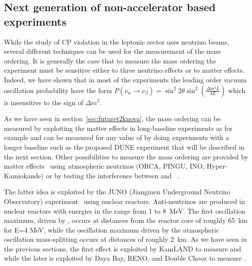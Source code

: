 \subsection{Next generation of non-accelerator based experiments}

While the study of CP violation in the leptonic sector uses neutrino beams, several different techniques can be used for the measurement of the mass ordering.
It is generally the case that to measure the mass ordering the experiment must be sensitive either to three neutrino effects or to matter effects. Indeed, we have shown that in most of the experiments the leading order vacuum oscillation probability have the form $P(\nu_\alpha \rightarrow \nu_\beta) = \sin^2 2 \theta \sin^2 (\frac{\Delta m^2 L}{4E})$ which is insensitive to the sign of $\Delta m^2$. 

As we have seen in section~\ref{sec:futuret2knova}, the mass ordering can be measured by exploiting the matter effects in long-baseline experiments as for example \nova and can be measured for any value of \dcp by doing experiments with a longer baseline such as the proposed DUNE experiment that will be described in the next section. Other possibilities to measure the mass ordering are provided by  matter effects~\cite{razzaque} using atmospheric neutrinos (ORCA, PINGU, INO, Hyper-Kamiokande) or by testing the interference between \dmsq and \dmsqtwo~\cite{petcov}. 

The latter idea is exploited by the JUNO (Jiangmen Underground Neutrino Observatory) experiment~\cite{An:2015jdp} 
using nuclear reactors. 
Anti-neutrinos are produced in nuclear reactors with energies in the range from 1 to 8~MeV. The first oscillation maximum, driven by \dmsqso, occurs at distances from the reactor core of roughly 65~km for E=4 MeV, while the oscillation maximum driven by the atmospheric oscillation mass-splitting \dmsq occurs at distances of roughly 2~km. As we have seen in the previous sections, the first effect is exploited by KamLAND to measure \thsol and \dmsqso while the later is exploited by Daya Bay, RENO, and Double Chooz to measure \thint. 


